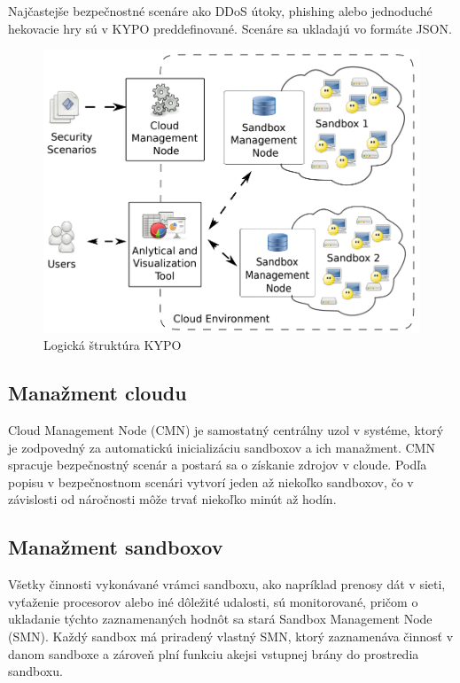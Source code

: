 \documentclass[
  digital, %
  twoside, %
  notable,   %
  nolof,   %
  nolot,   %
]{fithesis3}
\begin{document}
Najčastejše bezpečnostné scenáre ako DDoS útoky, phishing alebo jednoduché hekovacie hry sú v KYPO preddefinované. Scenáre sa ukladajú vo formáte JSON\cite{eichler2015kypo}.

\begin{figure}
	\center
	\includegraphics[width=0.875\linewidth]{kypo_logic_structure}
	\caption{Logická štruktúra KYPO\cite{eichler2015kypo}}
	\label{kypo_logic_structure}
\end{figure}

\subsection{Manažment cloudu}
Cloud Management Node (CMN) je samostatný centrálny uzol v systéme, ktorý je zodpovedný za automatickú inicializáciu sandboxov a ich manažment. CMN spracuje bezpečnostný scenár a postará sa o získanie zdrojov v cloude. Podľa popisu v bezpečnostnom scenári vytvorí jeden až niekoľko sandboxov, čo v závislosti od náročnosti môže trvať niekoľko minút až hodín\cite{eichler2015kypo}.

\subsection{Manažment sandboxov}
\label{smn}
Všetky činnosti vykonávané vrámci sandboxu, ako napríklad prenosy dát v sieti, vyťaženie procesorov alebo iné dôležité udalosti, sú monitorované, pričom o ukladanie týchto zaznamenaných hodnôt sa stará Sandbox Management Node (SMN). Každý sandbox má priradený vlastný SMN, ktorý zaznamenáva činnosť v danom sandboxe a zároveň plní funkciu akejsi vstupnej brány do prostredia sandboxu\cite{eichler2014analytical}.
\end{document}
